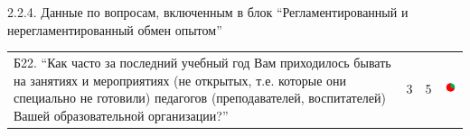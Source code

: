\begin{frame}{2.2.4. Данные по вопросам, включенным в блок ``Регламентированный и нерегламентированный обмен опытом'' }
\begin{tabular}{lccl}
\begin{minipage}{0.5\textwidth}
Б22. ``Как часто за последний учебный год Вам приходилось бывать на занятиях и мероприятиях (не открытых, т.е. которые они специально не готовили) педагогов (преподавателей, воспитателей) Вашей образовательной организации?''
\end{minipage}
& 3 & 5 &
\begin{minipage}{1.55cm}
\includegraphics[width=1.5cm, height=1.5cm]{diag.png}
\end{minipage}
\\
\end{tabular}


\end{frame}



